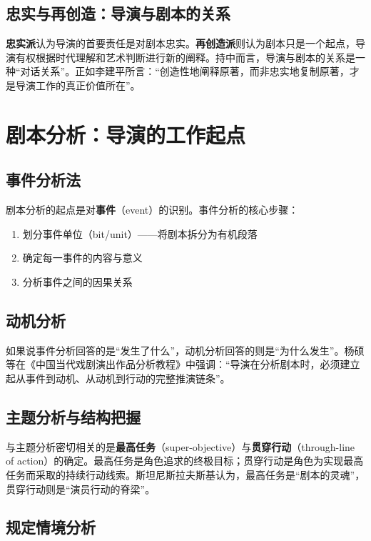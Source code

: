 \subsection{忠实与再创造：导演与剧本的关系}

\textbf{忠实派}认为导演的首要责任是对剧本忠实。\textbf{再创造派}则认为剧本只是一个起点，导演有权根据时代理解和艺术判断进行新的阐释。持中而言，导演与剧本的关系是一种\enquote{对话关系}。正如李建平所言：\enquote{创造性地阐释原著，而非忠实地复制原著，才是导演工作的真正价值所在}\cite{li:directing}。

\section{剧本分析：导演的工作起点}

\subsection{事件分析法}

剧本分析的起点是对\textbf{事件}（event）的识别。事件分析的核心步骤：
\begin{enumerate}
  \item 划分事件单位（bit/unit）——将剧本拆分为有机段落
  \item 确定每一事件的内容与意义
  \item 分析事件之间的因果关系
\end{enumerate}

\subsection{动机分析}

如果说事件分析回答的是\enquote{发生了什么}，动机分析回答的则是\enquote{为什么发生}。杨硕等在《中国当代戏剧演出作品分析教程》中强调：\enquote{导演在分析剧本时，必须建立起从事件到动机、从动机到行动的完整推演链条}\cite{yang:analysis}。

\subsection{主题分析与结构把握}

与主题分析密切相关的是\textbf{最高任务}（super-objective）与\textbf{贯穿行动}（through-line of action）的确定。最高任务是角色追求的终极目标；贯穿行动是角色为实现最高任务而采取的持续行动线索。斯坦尼斯拉夫斯基认为，最高任务是\enquote{剧本的灵魂}，贯穿行动则是\enquote{演员行动的脊梁}\cite{stanislavski:system}。

\subsection{规定情境分析}

